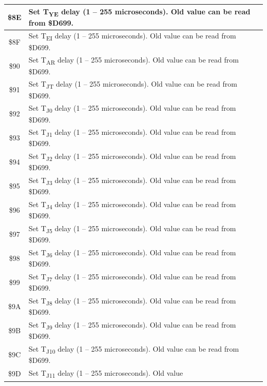 \begin{center}
\begin{longtable}{|c|L{8cm}|}
        \$8E & Set T\textsubscript{YE} delay (1 -- 255 microseconds). Old value
        can be read from \$D699. \\ \hline        
        \$8F & Set T\textsubscript{EI} delay (1 -- 255 microseconds). Old value
        can be read from \$D699. \\ \hline        
        \$90 & Set T\textsubscript{AR} delay (1 -- 255 microseconds). Old value
        can be read from \$D699. \\ \hline        
        \$91 & Set T\textsubscript{JT} delay (1 -- 255 microseconds). Old value
        can be read from \$D699. \\ \hline        
        \$92 & Set T\textsubscript{J0} delay (1 -- 255 microseconds). Old value
        can be read from \$D699. \\ \hline        
        \$93 & Set T\textsubscript{J1} delay (1 -- 255 microseconds). Old value
        can be read from \$D699. \\ \hline        
        \$94 & Set T\textsubscript{J2} delay (1 -- 255 microseconds). Old value
        can be read from \$D699. \\ \hline        
        \$95 & Set T\textsubscript{J3} delay (1 -- 255 microseconds). Old value
        can be read from \$D699. \\ \hline        
        \$96 & Set T\textsubscript{J4} delay (1 -- 255 microseconds). Old value
        can be read from \$D699. \\ \hline        
        \$97 & Set T\textsubscript{J5} delay (1 -- 255 microseconds). Old value
        can be read from \$D699. \\ \hline        
        \$98 & Set T\textsubscript{J6} delay (1 -- 255 microseconds). Old value
        can be read from \$D699. \\ \hline        
        \$99 & Set T\textsubscript{J7} delay (1 -- 255 microseconds). Old value
        can be read from \$D699. \\ \hline        
        \$9A & Set T\textsubscript{J8} delay (1 -- 255 microseconds). Old value
        can be read from \$D699. \\ \hline        
        \$9B & Set T\textsubscript{J9} delay (1 -- 255 microseconds). Old value
        can be read from \$D699. \\ \hline        
        \$9C & Set T\textsubscript{J10} delay (1 -- 255 microseconds). Old value
        can be read from \$D699. \\ \hline        
        \$9D & Set T\textsubscript{J11} delay (1 -- 255 microseconds). Old value

\end{longtable}
\end{center}
